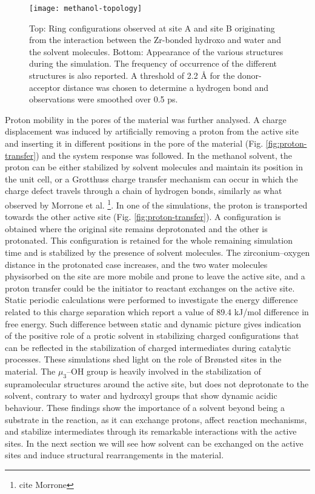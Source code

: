 \begin{figure}[!htbp]
	\centering
	\texttt{[image: methanol-topology]}
	\caption{Top: Ring configurations observed at site A and site B originating from the interaction between the Zr-bonded hydroxo and water and the solvent molecules. Bottom: Appearance of the various structures during the simulation. The frequency of occurrence of the different structures is also reported. A threshold of 2.2 Å for the donor-acceptor distance was chosen to determine a hydrogen bond and observations were smoothed over 0.5 ps.}
	\label{fig:methanol-topology}
\end{figure}
\npar
Proton mobility in the pores of the material was further analysed. A charge displacement was induced by artificially removing a proton from the active site and inserting it in different positions in the pore of the material (Fig. \ref{fig:proton-transfer}) and the system response was followed. In the methanol solvent, the proton can be either stabilized by solvent molecules and maintain its position in the unit cell, or a Grotthuss charge transfer mechanism can occur in which the charge defect travels through a chain of hydrogen bonds, similarly as what observed by Morrone et al. \footnote{cite Morrone}. In one of the simulations, the proton is transported towards the other active site (Fig. \ref{fig:proton-transfer}). A configuration is obtained where the original site remains deprotonated and the other is protonated. This configuration is retained for the whole remaining simulation time and is stabilized by the presence of solvent molecules. The zirconium--oxygen distance in the protonated case increases, and the two water molecules physisorbed on the site are more mobile and prone to leave the active site, and a proton transfer could be the initiator to reactant exchanges on the active site. Static periodic calculations were performed to investigate the energy difference related to this charge separation which report a value of 89.4 kJ/mol difference in free energy. Such difference between static and dynamic picture gives indication of the positive role of a protic solvent in stabilizing charged configurations that can be reflected in the stabilization of charged intermediates during catalytic processes. These simulations shed light on the role of Br\o{}nsted sites in the material. The $\mu_3$--OH group is heavily involved in the stabilization of supramolecular structures around the active site, but does not deprotonate to the solvent, contrary to water and hydroxyl groups that show dynamic acidic behaviour. These findings show the importance of a solvent beyond being a substrate in the reaction, as it can exchange protons, affect reaction mechanisms, and stabilize intermediates through its remarkable interactions with the active sites. In the next section we will see how solvent can be exchanged on the active sites and induce structural rearrangements in the material.


